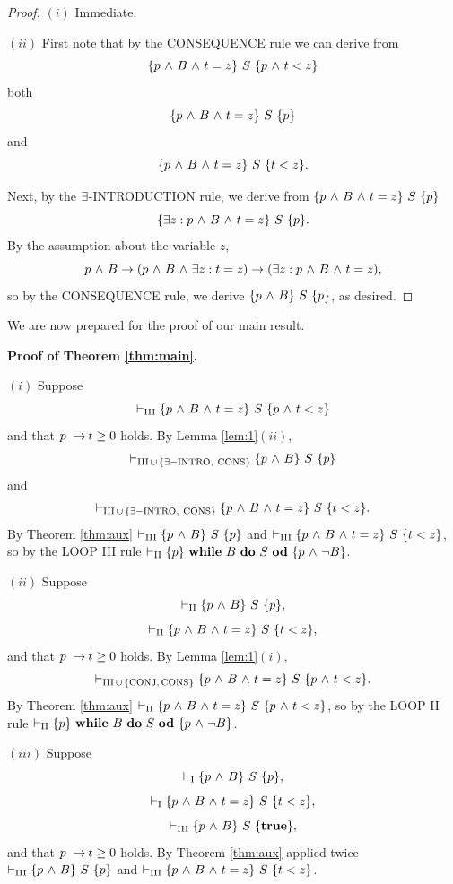 \documentclass[runningheads]{llncs}       %
\begin{document}
\begin{proof}
$(i)$ Immediate. 
\III

\NI
$(ii)$
First note that by the CONSEQUENCE rule we can derive
from
\[
 \HT{p \A B \A t=z}{S}{p \A t<z}
\]
both
\[
 \HT{p \A B \A t=z}{S}{p}
\]
and
\[
\HT{p \A B \A t=z}{S}{t<z}.
\]

Next, by the $\te$-INTRODUCTION rule, we derive from
$\HT{p \A B \A t=z}{S}{p}$
\[
 \HT{\te z: p \A B \A t=z}{S}{p}.
\]
By the assumption about the variable $z$,
\[
  p \A B \to (p \A B \A \te z: t=z) \to  (\te z: p \A B \A t=z),
\]
so by the CONSEQUENCE rule, we derive $\HT{p \A B}{S}{p}$, as desired.
\HB
\end{proof}




We are now prepared for the proof of our main result.
\III

\NI
\textbf{Proof of Theorem \ref{thm:main}.}

\NI
$(i)$ Suppose
\[
  \vdash_{\rm III} \HT{p \A B \A t=z}{S}{p \A t<z}
\]
and that
$p\ \ra t \geq 0$ holds.
By Lemma \ref{lem:1}$(ii)$,
\[
  \vdash_{\rm{III}\, \cup\, \{\exists -{\rm INTRO}, \ \rm{CONS}\}} \HT{p \A B} {S}{p}\]
and
\[
  \vdash_{\rm{III}\, \cup\, \{\exists -{\rm INTRO}, \ \rm{CONS}\}} \HT{p \A B \A t=z}{S}{t<z}.
\]
By Theorem \ref{thm:aux}
$\vdash_{\rm III} \HT{p \A B} {S}{p}$ and
$\vdash_{\rm III} \HT{p \A B \A t=z}{S}{t<z}$, 
so by the LOOP III rule
$\vdash_{\rm II} \HT{p}{\WDD{B}{S}}{p \A \neg B}$.
\vspace{2mm}




\NI
$(ii)$ Suppose
\[
  \vdash_{\rm II} \HT{p \A B} {S}{p},
\]
\[
  \vdash_{\rm II} \HT{p \A B \A t=z}{S}{t<z},
\]
and that
$p\ \ra t \geq 0$ holds.
By Lemma \ref{lem:1}$(i)$,
\[
  \vdash_{\rm{III}\, \cup\, \{\rm{CONJ},\,\rm{CONS}\}} \HT{p \A B \A t=z}{S}{p \A t<z}.
\]
By Theorem \ref{thm:aux}
$\vdash_{\rm II} \HT{p \A B \A t=z}{S}{p \A t<z}$, so by the LOOP II rule
$\vdash_{\rm II} \HT{p}{\WDD{B}{S}}{p \A \neg B}$.
\vspace{2mm}

\NI
$(iii)$ 
Suppose
\[
  \vdash_{\rm{I}}  \HT{p \A B}{S}{p},
\]
\[
  \vdash_{\rm{I}}  \HT{p \A B \A t=z}{S}{t<z},
\]
\[
  \vdash_{\rm{III}} \HT{p \A B}{S}{\mathbf{true}},
\]
and that
$p\ \ra t \geq 0$ holds. By Theorem \ref{thm:aux} applied twice
$\vdash_{\rm III} \HT{p \A B}{S}{p}$
and
$\vdash_{\rm III} \HT{p \A B \A t=z}{S}{t<z}$.
\end{document}
